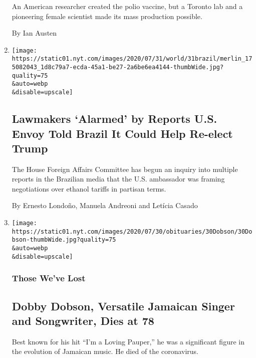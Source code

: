 \begin{enumerate}
  An American researcher created the polio vaccine, but a Toronto lab
  and a pioneering female scientist made its mass production possible.

  By Ian Austen
\item
  \href{/2020/07/31/world/americas/brazil-trump-ethanol-chapman.html}{}

  \texttt{[image: https://static01.nyt.com/images/2020/07/31/world/31brazil/merlin\_175082043\_1d8c79a7-ecda-45a1-be27-2a6be6ea4144-thumbWide.jpg?quality=75\\\&auto=webp\\\&disable=upscale]}

  \hypertarget{lawmakers-alarmed-by-reports-us-envoy-told-brazil-it-could-help-re-elect-trump}{%
  \subsection{Lawmakers `Alarmed' by Reports U.S. Envoy Told Brazil It
  Could Help Re-elect
  Trump}\label{lawmakers-alarmed-by-reports-us-envoy-told-brazil-it-could-help-re-elect-trump}}

  The House Foreign Affairs Committee has begun an inquiry into multiple
  reports in the Brazilian media that the U.S. ambassador was framing
  negotiations over ethanol tariffs in partisan terms.

  By Ernesto Londoño, Manuela Andreoni and Letícia Casado
\item
  \href{/2020/07/31/obituaries/dobby-dobson-dead-coronavirus.html}{}

  \texttt{[image: https://static01.nyt.com/images/2020/07/30/obituaries/30Dobson/30Dobson-thumbWide.jpg?quality=75\\\&auto=webp\\\&disable=upscale]}

  \hypertarget{those-weve-lost-1}{%
  \subsubsection{Those We've Lost}\label{those-weve-lost-1}}

  \hypertarget{dobby-dobson-versatile-jamaican-singer-and-songwriter-dies-at-78}{%
  \subsection{Dobby Dobson, Versatile Jamaican Singer and Songwriter,
  Dies at
  78}\label{dobby-dobson-versatile-jamaican-singer-and-songwriter-dies-at-78}}

  Best known for his hit ``I'm a Loving Pauper,'' he was a significant
  figure in the evolution of Jamaican music. He died of the coronavirus.


\end{enumerate}
